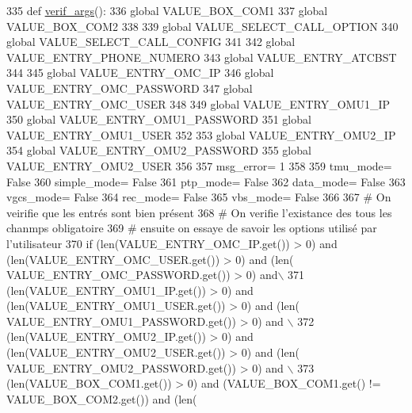 \begin{DoxyCode}
335 \textcolor{keyword}{def }\hyperlink{namespaceScript_1_1interfaceFrame_a7a90dd83e0b67edcf2dee870d927e98e}{verif\_args}():
336     \textcolor{keyword}{global} VALUE\_BOX\_COM1 
337     \textcolor{keyword}{global} VALUE\_BOX\_COM2
338     
339     \textcolor{keyword}{global} VALUE\_SELECT\_CALL\_OPTION
340     \textcolor{keyword}{global} VALUE\_SELECT\_CALL\_CONFIG
341     
342     \textcolor{keyword}{global} VALUE\_ENTRY\_PHONE\_NUMERO
343     \textcolor{keyword}{global} VALUE\_ENTRY\_ATCBST
344 
345     \textcolor{keyword}{global} VALUE\_ENTRY\_OMC\_IP
346     \textcolor{keyword}{global} VALUE\_ENTRY\_OMC\_PASSWORD
347     \textcolor{keyword}{global} VALUE\_ENTRY\_OMC\_USER
348 
349     \textcolor{keyword}{global} VALUE\_ENTRY\_OMU1\_IP
350     \textcolor{keyword}{global} VALUE\_ENTRY\_OMU1\_PASSWORD
351     \textcolor{keyword}{global} VALUE\_ENTRY\_OMU1\_USER
352 
353     \textcolor{keyword}{global} VALUE\_ENTRY\_OMU2\_IP
354     \textcolor{keyword}{global} VALUE\_ENTRY\_OMU2\_PASSWORD
355     \textcolor{keyword}{global} VALUE\_ENTRY\_OMU2\_USER
356 
357     msg\_error= 1
358 
359     tmu\_mode= \textcolor{keyword}{False}
360     simple\_mode= \textcolor{keyword}{False}
361     ptp\_mode= \textcolor{keyword}{False}
362     data\_mode= \textcolor{keyword}{False}
363     vgcs\_mode= \textcolor{keyword}{False}
364     rec\_mode= \textcolor{keyword}{False}
365     vbs\_mode= \textcolor{keyword}{False}
366 
367     \textcolor{comment}{# On veirifie que les entrés sont bien présent
}
368     \textcolor{comment}{# On verifie l'existance des tous les chanmps obligatoire
}
369     \textcolor{comment}{# ensuite on essaye de savoir les options utilisé par l'utilisateur
}
370     \textcolor{keywordflow}{if} (len(VALUE\_ENTRY\_OMC\_IP.get()) > 0) \textcolor{keywordflow}{and} (len(VALUE\_ENTRY\_OMC\_USER.get()) > 0) \textcolor{keywordflow}{and} (len(
      VALUE\_ENTRY\_OMC\_PASSWORD.get()) > 0) \textcolor{keywordflow}{and}\(\backslash\)
371     (len(VALUE\_ENTRY\_OMU1\_IP.get()) > 0) \textcolor{keywordflow}{and} (len(VALUE\_ENTRY\_OMU1\_USER.get()) > 0) \textcolor{keywordflow}{and} (len(
      VALUE\_ENTRY\_OMU1\_PASSWORD.get()) > 0) \textcolor{keywordflow}{and} \(\backslash\)
372     (len(VALUE\_ENTRY\_OMU2\_IP.get()) > 0) \textcolor{keywordflow}{and} (len(VALUE\_ENTRY\_OMU2\_USER.get()) > 0) \textcolor{keywordflow}{and} (len(
      VALUE\_ENTRY\_OMU2\_PASSWORD.get()) > 0) \textcolor{keywordflow}{and} \(\backslash\)
373     (len(VALUE\_BOX\_COM1.get()) > 0) \textcolor{keywordflow}{and} (VALUE\_BOX\_COM1.get()  != VALUE\_BOX\_COM2.get()) \textcolor{keywordflow}{and} (len(

\end{DoxyCode}
